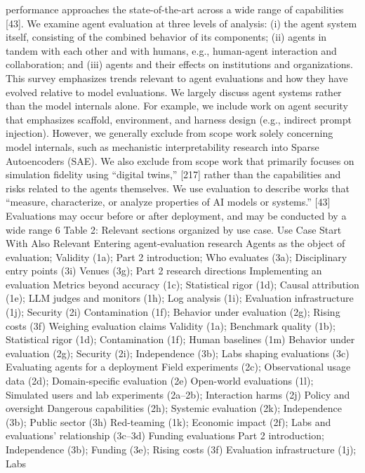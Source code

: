 performance approaches the state-of-the-art across a wide range of capabilities [43]. We examine agent
evaluation at three levels of analysis: (i) the agent system itself, consisting of the combined behavior of its
components; (ii) agents in tandem with each other and with humans, e.g., human-agent interaction and
collaboration; and (iii) agents and their effects on institutions and organizations.
This survey emphasizes trends relevant to agent evaluations and how they have evolved relative to model
evaluations. We largely discuss agent systems rather than the model internals alone. For example, we
include work on agent security that emphasizes scaffold, environment, and harness design (e.g., indirect
prompt injection). However, we generally exclude from scope work solely concerning model internals, such
as mechanistic interpretability research into Sparse Autoencoders (SAE). We also exclude from scope work
that primarily focuses on simulation fidelity using “digital twins,” [217] rather than the capabilities and
risks related to the agents themselves.
We use evaluation to describe works that “measure, characterize, or analyze properties of AI models or
systems.” [43] Evaluations may occur before or after deployment, and may be conducted by a wide range
6
Table 2: Relevant sections organized by use case.
Use Case
Start With
Also Relevant
Entering
agent-evaluation
research
Agents as the object of evaluation; Validity (1a);
Part 2 introduction; Who evaluates (3a);
Disciplinary entry points (3i)
Venues (3g); Part 2 research
directions
Implementing an
evaluation
Metrics beyond accuracy (1c); Statistical
rigor (1d); Causal attribution (1e); LLM judges
and monitors (1h); Log analysis (1i); Evaluation
infrastructure (1j); Security (2i)
Contamination (1f); Behavior under
evaluation (2g); Rising costs (3f)
Weighing evaluation
claims
Validity (1a); Benchmark quality (1b); Statistical
rigor (1d); Contamination (1f); Human
baselines (1m)
Behavior under evaluation (2g);
Security (2i); Independence (3b);
Labs shaping evaluations (3c)
Evaluating agents for a
deployment
Field experiments (2c); Observational usage
data (2d); Domain-specific evaluation (2e)
Open-world evaluations (1l);
Simulated users and lab
experiments (2a–2b); Interaction
harms (2j)
Policy and oversight
Dangerous capabilities (2h); Systemic
evaluation (2k); Independence (3b); Public
sector (3h)
Red-teaming (1k); Economic
impact (2f); Labs and evaluations’
relationship (3c–3d)
Funding evaluations
Part 2 introduction; Independence (3b);
Funding (3e); Rising costs (3f)
Evaluation infrastructure (1j); Labs
